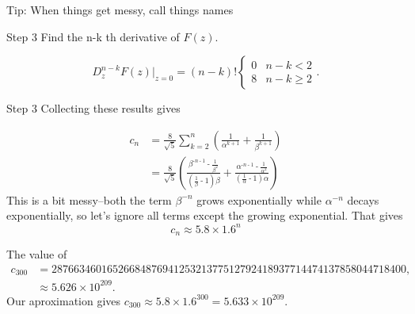 \documentclass[portrait,fleqn,12pt]{beamer}
\begin{document}
\begin{frame}{Tip: When things get messy, call things names}

\end{frame}
\begin{frame}{Step 3}
Find the n-k th derivative of $F(z) $.

\begin{equation}
D^{n-k} _z F(z ) \vert_{z=0}  = (n-k) ! \begin{cases} 0 &  n -k < 2 \\  8  & n -k \geq  2 \end{cases}.
\end{equation}
\end{frame}
\begin{frame}{Step 3}
Collecting these results gives

\begin{align*}
 c_n &= \frac{8}{\sqrt{5}} \sum_{k=2}^n \left ( \frac{1}{\alpha^{k+1}} + \frac{1}{\beta^{k+1}} \right) \\
       &=   \frac{8}{\sqrt{5}} \left(\frac{{{\beta }^{\operatorname{-}n\operatorname{-}1}}\operatorname{-}\frac{1}{{{\beta }^{2}}}}{\left( \frac{1}{\beta }\operatorname{-}1\right)  \beta }\operatorname{+}\frac{{{\alpha }^{\operatorname{-}n\operatorname{-}1}}\operatorname{-}\frac{1}{{{\alpha }^{2}}}}{\left( \frac{1}{\alpha }\operatorname{-}1\right)  \alpha } \right)
\end{align*}
This is a bit messy--both the term $\beta^{-n}$ grows exponentially while $\alpha^{-n}$ decays exponentially, so let's ignore all terms except the growing exponential. That gives
\begin{equation}
   c_n \approx 5.8 \times 1.6^n
\end{equation}
\end{frame}

\begin{frame}
The value of 
\begin{align*}
c_{300} &= 2876634601652668487694125321377512792418937714474137858044718400, \\
             &\approx 5.626 \times 10^{209}.
\end{align*}
Our aproximation gives $c_{300} \approx 5.8 \times 1.6^{300}  =  5.633 \times 10^{209}.$

\end{frame}
\end{document}
